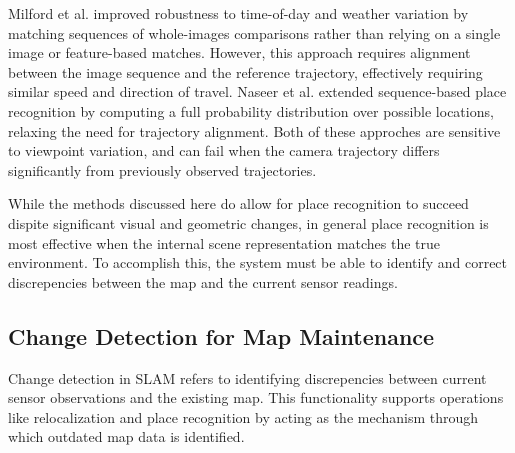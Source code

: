 Milford et al. improved robustness to time-of-day and weather variation by matching sequences of whole-images comparisons rather than relying on a single image or feature-based matches. However, this approach requires alignment between the image sequence and the reference trajectory, effectively requiring similar speed and direction of travel. Naseer et al. \cite{naseerVisionbasedMarkovLocalization2015} extended sequence-based place recognition by computing a full probability distribution over possible locations, relaxing the need for trajectory alignment. Both of these approches are sensitive to viewpoint variation, and can fail when the camera trajectory differs significantly from previously observed trajectories.

While the methods discussed here do allow for place recognition to succeed dispite significant visual and geometric changes, in general place recognition is most effective when the internal scene representation matches the true environment. To accomplish this, the system must be able to identify and correct discrepencies between the map and the current sensor readings.

\subsection{Change Detection for Map Maintenance}

Change detection in SLAM refers to identifying discrepencies between current sensor observations and the existing map. This functionality supports operations like relocalization and place recognition by acting as the mechanism through which outdated map data is identified.

